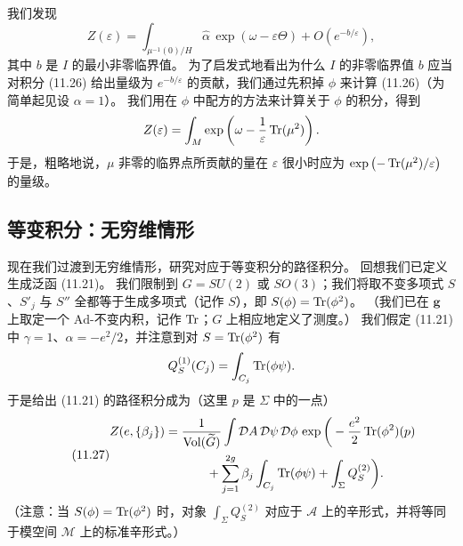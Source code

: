 我们发现
\[
Z(\varepsilon)=\int_{\mu^{-1}(0)/H}\widehat\alpha\,\exp(\omega-\varepsilon\Theta)
+O(e^{-b/\varepsilon}),
\]
其中 $b$ 是 $I$ 的最小非零临界值。
为了启发式地看出为什么 $I$ 的非零临界值 $b$ 应当对积分 (11.26) 给出量级为 $e^{-b/\varepsilon}$ 的贡献，我们通过先积掉 $\phi$ 来计算 (11.26)（为简单起见设 $\alpha=1$）。
我们用在 $\phi$ 中配方的方法来计算关于 $\phi$ 的积分，得到
\[
Z(\varepsilon)=\int_{M}\exp\left(\omega-\frac{1}{\varepsilon}\operatorname{Tr}(\mu^{2})\right).
\]
于是，粗略地说，$\mu$ 非零的临界点所贡献的量在 $\varepsilon$ 很小时应为 $\exp\left(-\operatorname{Tr}(\mu^{2})/\varepsilon\right)$ 的量级。

\subsection{等变积分：无穷维情形}

现在我们过渡到无穷维情形，研究对应于等变积分的路径积分。
回想我们已定义生成泛函 (11.21)。
我们限制到 $G=SU(2)$ 或 $SO(3)$；我们将取不变多项式 $S$、$S'_{j}$ 与 $S''$ 全都等于生成多项式（记作 $S$），即 $S(\phi)=\operatorname{Tr}(\phi^{2})$。
（我们已在 $\mathbf{g}$ 上取定一个 $\mathrm{Ad}$-不变内积，记作 $\operatorname{Tr}$；$G$ 上相应地定义了测度。）
我们假定 (11.21) 中 $\gamma=1$、$\alpha=-e^{2}/2$，并注意到对 $S=\operatorname{Tr}(\phi^{2})$ 有
\[
Q_{S}^{(1)}(C_{j})=\int_{C_{j}}\operatorname{Tr}(\phi\psi).
\]
于是给出 (11.21) 的路径积分成为（这里 $p$ 是 $\Sigma$ 中的一点）
\begin{equation}
  \tag{11.27}
  \label{eq:11-27}
  \begin{aligned}
  Z(e,\{\beta_{j}\})={}&\frac{1}{\mathrm{Vol}(\widetilde G)}
  \int\mathcal{D}A\,\mathcal{D}\psi\,\mathcal{D}\phi\,
  \exp\bigg(-\frac{e^{2}}{2}\operatorname{Tr}(\phi^{2})(p)\\
  &\qquad+\sum_{j=1}^{2g}\beta_{j}\int_{C_{j}}\operatorname{Tr}(\phi\psi)+\int_{\Sigma}Q_{S}^{(2)}\bigg).
  \end{aligned}
\end{equation}
（注意：当 $S(\phi)=\operatorname{Tr}(\phi^{2})$ 时，对象 $\int_{\Sigma}Q_{S}^{(2)}$ 对应于 $\mathcal{A}$ 上的辛形式，并将等同于模空间 $\mathcal{M}$ 上的标准辛形式。）



